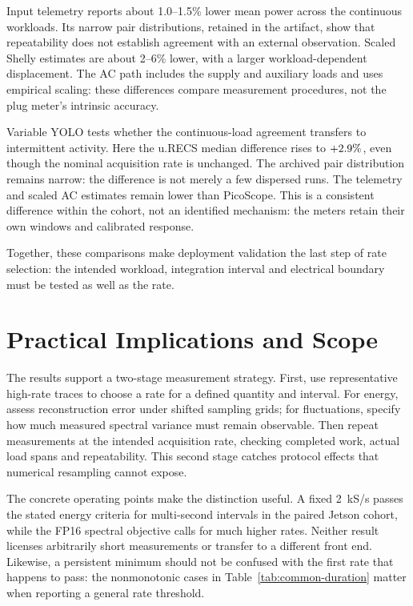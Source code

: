 \documentclass[a4paper,UKenglish,cleveref,autoref]{oasics-v2021}
\newcommand{\urecs}{u.RECS}
\begin{document}
Input telemetry reports about 1.0--1.5\% lower mean power across the continuous workloads. Its narrow pair distributions, retained in the artifact, show that repeatability does not establish agreement with an external observation. Scaled Shelly estimates are about 2--6\% lower, with a larger workload-dependent displacement. The AC path includes the supply and auxiliary loads and uses empirical scaling: these differences compare measurement procedures, not the plug meter's intrinsic accuracy.

Variable YOLO tests whether the continuous-load agreement transfers to intermittent activity. Here the \urecs{} median difference rises to $+2.9\%$, even though the nominal acquisition rate is unchanged. The archived pair distribution remains narrow: the difference is not merely a few dispersed runs. The telemetry and scaled AC estimates remain lower than PicoScope. This is a consistent difference within the cohort, not an identified mechanism: the meters retain their own windows and calibrated response.

Together, these comparisons make deployment validation the last step of rate selection: the intended workload, integration interval and electrical boundary must be tested as well as the rate.

\FloatBarrier
\section{Practical Implications and Scope}
The results support a two-stage measurement strategy. First, use representative high-rate traces to choose a rate for a defined quantity and interval. For energy, assess reconstruction error under shifted sampling grids; for fluctuations, specify how much measured spectral variance must remain observable. Then repeat measurements at the intended acquisition rate, checking completed work, actual load spans and repeatability. This second stage catches protocol effects that numerical resampling cannot expose.

The concrete operating points make the distinction useful. A fixed 2~kS/s passes the stated energy criteria for multi-second intervals in the paired Jetson cohort, while the FP16 spectral objective calls for much higher rates. Neither result licenses arbitrarily short measurements or transfer to a different front end. Likewise, a persistent minimum should not be confused with the first rate that happens to pass: the nonmonotonic cases in Table~\ref{tab:common-duration} matter when reporting a general rate threshold.
\end{document}
